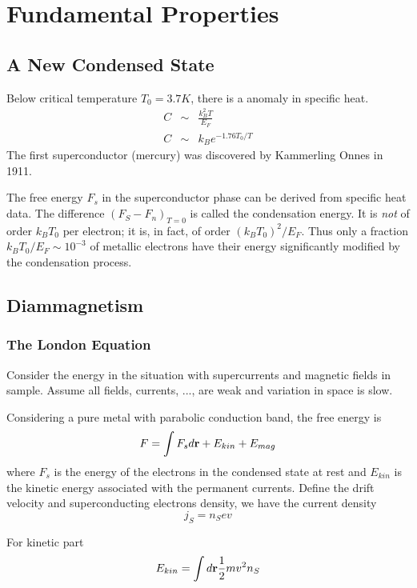 \chapter{Fundamental Properties}

\section{A New Condensed State}\label{sec:1.1}
Below critical temperature $T_{0} = 3.7K$, there is a anomaly in specific heat.
\begin{eqnarray}
  C &\sim& \frac{k_{B}^{2}T}{E_{F}} \\
  C &\sim& k_{B} e^{-1.76 T_{0}/T}
\end{eqnarray}
The first superconductor (mercury) was discovered by Kammerling Onnes in 1911.

The free energy $F_{s}$ in the superconductor phase can be derived from specific heat data.
The difference $(F_S - F_n)_{T=0}$ is called the condensation energy.
It is \textit{not} of order $k_BT_0$ per electron; it is, in fact, of order $(k_B T_0)^2/E_F$.
Thus only a fraction $k_B T_0 /E_F \sim 10^{-3}$ of metallic electrons have their energy significantly modified by the condensation process.

\section{Diammagnetism}\label{sec:1.2}
\subsection{The London Equation}
Consider the energy in the situation with supercurrents and magnetic fields in sample.
Assume all fields, currents, ..., are weak and variation in space is slow.

Considering a pure metal with parabolic conduction band, the free energy is
\begin{equation}
 F = \int F_s d \mathbf{r} + E_{kin} + E_{mag}
 \label{eq:1.1}
\end{equation}
where $F_s$ is the energy of the electrons in the condensed state at rest and $E_{kin}$ is the kinetic energy associated with the permanent currents.
Define the drift velocity and superconducting electrons density, we have the current density
\begin{equation}
 j_S = n_S e v
 \label{eq:1.2}
\end{equation}

For kinetic part
\begin{equation}
 E_{kin} = \int d \mathbf{r} \frac{1}{2} m v^2 n_S
 \label{eq:1.3}
\end{equation}

